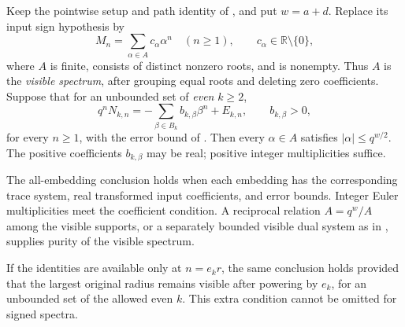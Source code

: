 \begin{finding}\label{f:signed}
Keep the pointwise setup and path identity of , and put $w=a+d$.
Replace its input sign hypothesis by
\[
 M_n=\sum_{\alpha\in A}c_\alpha\alpha^n\quad(n\ge1),
 \qquad c_\alpha\in\mathbb R\setminus\{0\},
\]
where $A$ is finite, consists of distinct nonzero roots, and is nonempty.
Thus $A$ is the \emph{visible spectrum}, after grouping equal roots and deleting
zero coefficients. Suppose that for an unbounded set of \emph{even} $k\ge2$,
\[
 q^nN_{k,n}=-\sum_{\beta\in B_k}b_{k,\beta}\beta^n+E_{k,n},
 \qquad b_{k,\beta}>0,
\]
for every $n\ge1$, with the error bound of . Then every
$\alpha\in A$ satisfies $|\alpha|\le q^{w/2}$. The positive coefficients
$b_{k,\beta}$ may be real; positive integer multiplicities suffice.

The all-embedding conclusion holds when each embedding has the corresponding
trace system, real transformed input coefficients, and error bounds. Integer
Euler multiplicities meet the coefficient condition. A reciprocal relation
$A=q^w/A$ among the visible supports, or a separately bounded visible dual
system as in , supplies purity of the visible spectrum.

If the identities are available only at $n=e_kr$, the same conclusion holds
provided that the largest original radius remains visible after powering
by $e_k$, for an unbounded set of the allowed even $k$. This extra condition
cannot be omitted for signed spectra.
\end{finding}
